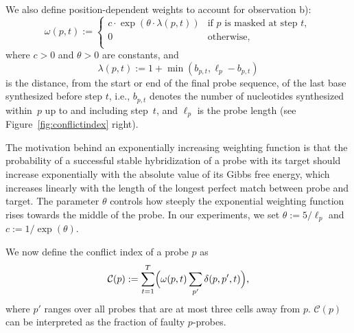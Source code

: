 \documentclass[english]{lni}
\begin{document}
We also define position-dependent weights to account for observation b):
\begin{equation}\label{eq:pos_mult}
\omega(p,t) :=
\left\{
        \begin{array}{ll}
                c \cdot \exp{\left(\theta \cdot \lambda(p,t)\right)} & \mbox{if $p$ is masked at step $t$}, \\
                0 & \mbox{otherwise}, \\
        \end{array}
\right.
\end{equation}
where $c>0$ and $\theta>0$ are constants, and
\begin{equation}\label{eq:base_pos}
  \lambda(p,t) := 1 + \min(b_{p,t},\ell_{p} - b_{p,t})
\end{equation}
is the distance, from the start or end of the final probe sequence, of the
last base synthesized before step $t$, i.e., $b_{p,t}$ denotes the number of
nucleotides synthesized within~$p$ up to and including step~$t$, and
$\ell_p$ is the probe length (see Figure~\ref{fig:conflictindex}
right).

The motivation
behind an exponentially increasing weighting function is that the
probability of a successful stable hybridization of a probe with its
target should increase exponentially with the absolute value of its
Gibbs free energy, which increases linearly with the length of the
longest perfect match between probe and target. The parameter $\theta$
controls how steeply the exponential weighting function rises towards
the middle of the probe. In our experiments, we set $\theta := 5/\ell_p$
and $c := 1/\exp(\theta)$.

We now define the conflict index of a probe $p$ as
\begin{equation}
\label{eq:conf_idx}
\mathcal{C}(p) := \sum_{t=1}^{T} \Bigl( \omega(p,t) \sum_{p'} \delta(p,p',t) \Bigr),
\end{equation}
where $p'$ ranges over all probes that are at most three cells away
from $p$.  $\mathcal{C}(p)$ can be interpreted as the fraction of
faulty $p$-probes.
\end{document}
